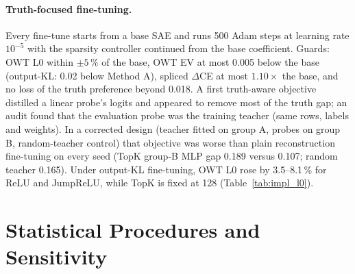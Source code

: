\paragraph{Truth-focused fine-tuning.} Every fine-tune starts from a base SAE and runs 500 Adam steps at learning rate
$10^{-5}$ with the sparsity controller continued from the base coefficient. Guards: OWT L0 within $\pm5\,\%$ of the base,
OWT EV at most 0.005 below the base (output-KL: 0.02 below Method A), spliced $\Delta$CE at most $1.10\times$ the base,
and no loss of the truth preference beyond 0.018. A first truth-aware objective distilled a linear probe's logits and
appeared to remove most of the truth gap; an audit found that the evaluation probe was the training teacher (same rows,
labels and weights). In a corrected design (teacher fitted on group A, probes on group B, random-teacher control) that
objective was worse than plain reconstruction fine-tuning on every seed (TopK group-B MLP gap 0.189 versus 0.107; random
teacher 0.165). Under output-KL fine-tuning, OWT L0 rose by 3.5--8.1\,\% for ReLU and JumpReLU, while TopK is
fixed at 128 (Table~\ref{tab:impl_l0}).

\section{Statistical Procedures and Sensitivity}\label{app:stats}

